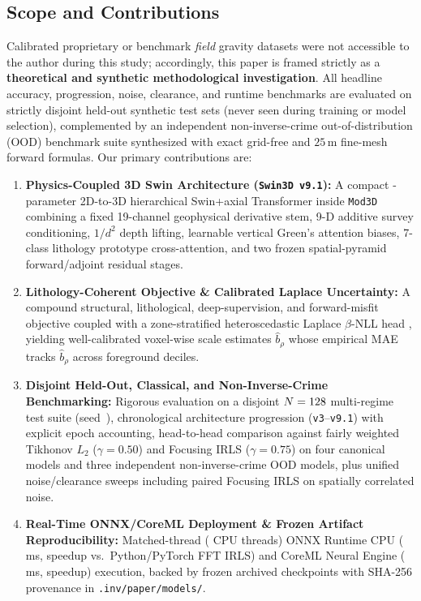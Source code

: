 \documentclass[11pt,a4paper]{article}
\begin{document}
\subsection{Scope and Contributions}

Calibrated proprietary or benchmark \emph{field} gravity datasets were not accessible to the author during this study; accordingly, this paper is framed strictly as a \textbf{theoretical and synthetic methodological investigation}. All headline accuracy, progression, noise, clearance, and runtime benchmarks are evaluated on strictly disjoint held-out synthetic test sets (never seen during training or model selection), complemented by an independent non-inverse-crime out-of-distribution (OOD) benchmark suite synthesized with exact grid-free and $25$\,m fine-mesh forward formulas. Our primary contributions are:

\begin{enumerate}[leftmargin=1.4em,itemsep=0.35em]
  \item \textbf{Physics-Coupled 3D Swin Architecture (\texttt{Swin3D v9.1}):} A compact \valVNineOneParams{}-parameter 2D-to-3D hierarchical Swin+axial Transformer inside \texttt{Mod3D} \citep{cerovsky_mod3d} combining a fixed 19-channel geophysical derivative stem, 9-D additive survey conditioning, $1/d^2$ depth lifting, learnable vertical Green's attention biases, 7-class lithology prototype cross-attention, and two frozen spatial-pyramid forward/adjoint residual stages.
  \item \textbf{Lithology-Coherent Objective \& Calibrated Laplace Uncertainty:} A compound structural, lithological, deep-supervision, and forward-misfit objective coupled with a zone-stratified heteroscedastic Laplace $\beta$-NLL head \citep{kendall2017,seitzer2022betanll}, yielding well-calibrated voxel-wise scale estimates $\hat{b}_\rho$ whose empirical MAE tracks $\hat{b}_\rho$ across foreground deciles.
  \item \textbf{Disjoint Held-Out, Classical, and Non-Inverse-Crime Benchmarking:} Rigorous evaluation on a disjoint $N=128{}$ multi-regime test suite (seed~\valTestSeed{}), chronological architecture progression (\texttt{v3}--\texttt{v9.1}) with explicit epoch accounting, head-to-head comparison against fairly weighted Tikhonov $L_2$ ($\gamma=0.50$) and Focusing IRLS ($\gamma=0.75$) on four canonical models and three independent non-inverse-crime OOD models, plus unified noise/clearance sweeps including paired Focusing IRLS on spatially correlated noise.
  \item \textbf{Real-Time ONNX/CoreML Deployment \& Frozen Artifact Reproducibility:} Matched-thread (\valCpuThreads{} CPU threads) ONNX Runtime CPU (\valTimeOnnxCpuMs{}\,ms, \valSpeedupOnnxVsFoc{} speedup vs.\ Python/PyTorch FFT IRLS) and CoreML Neural Engine (\valTimeCoremlMs{}\,ms, \valSpeedupCoremlVsFoc{} speedup) execution, backed by frozen archived checkpoints with SHA-256 provenance in \texttt{.inv/paper/models/}.
\end{enumerate}
\end{document}

